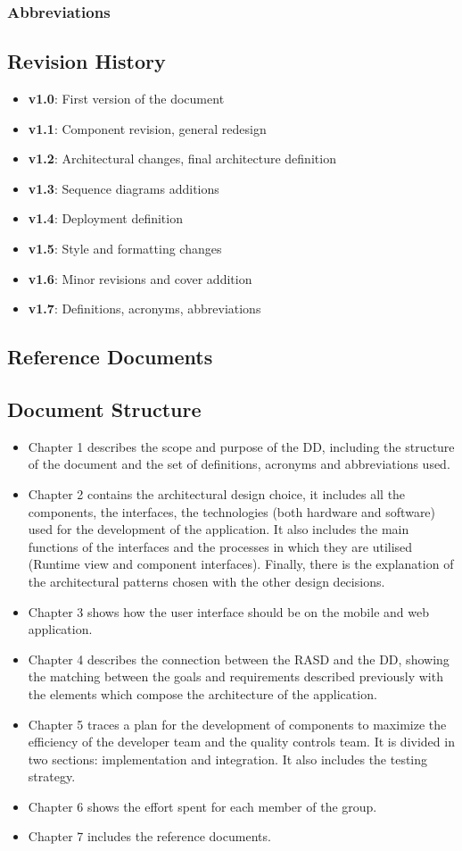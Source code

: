 \subsubsection{Abbreviations}
\subsection{Revision History}
\begin{itemize}
	\item \textbf{v1.0}: First version of the document
	\item \textbf{v1.1}: Component revision, general redesign
	\item \textbf{v1.2}: Architectural changes, final architecture definition
	\item \textbf{v1.3}: Sequence diagrams additions
	\item \textbf{v1.4}: Deployment definition
	\item \textbf{v1.5}: Style and formatting changes
	\item \textbf{v1.6}: Minor revisions and cover addition
	\item \textbf{v1.7}: Definitions, acronyms, abbreviations
	
\end{itemize}

\subsection{Reference Documents}
\subsection{Document Structure}
\begin{itemize}
	\item Chapter 1 describes the scope and purpose of the DD, including the structure of the document and the set of definitions, acronyms and abbreviations used.
	\item Chapter 2 contains the architectural design choice, it includes all the components, the interfaces, the technologies (both hardware and software) used for the development of the application. It also includes the main functions of the interfaces and the processes in which they are utilised (Runtime view and component interfaces). Finally, there is the explanation of the architectural patterns chosen with the other design decisions.
	\item Chapter 3 shows how the user interface should be on the mobile and web application.
	\item Chapter 4 describes the connection between the RASD and the DD, showing the matching between the goals and requirements described previously with the elements which compose the
architecture of the application.
	\item Chapter 5 traces a plan for the development of components to maximize the efficiency of the developer team and the quality controls team. It is divided in two sections: implementation and integration. It also includes the testing strategy.
	\item Chapter 6 shows the effort spent for each member of the group.
	\item Chapter 7 includes the reference documents.
\end{itemize}
